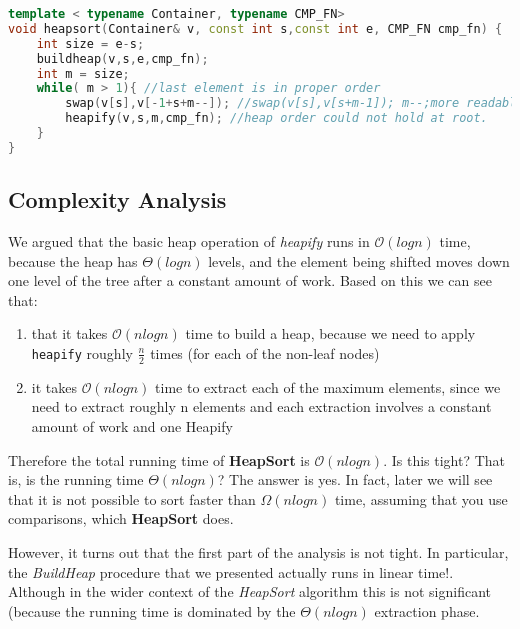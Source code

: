 \begin{lstlisting}[language=c++, caption="Create an heap from an unordered collection. cmp\_fn determines if it will be a min or max heap"]
template < typename Container, typename CMP_FN>
void heapsort(Container& v, const int s,const int e, CMP_FN cmp_fn) {
    int size = e-s;
    buildheap(v,s,e,cmp_fn);
    int m = size;
    while( m > 1){ //last element is in proper order
        swap(v[s],v[-1+s+m--]); //swap(v[s],v[s+m-1]); m--;more readable 
        heapify(v,s,m,cmp_fn); //heap order could not hold at root.
    }
}
\end{lstlisting}

\subsection{Complexity Analysis}
We argued that the basic heap operation of \textit{heapify} runs in $\mathcal{O}(log n)$ time, because the heap has $\mathcal{\Theta}(log n)$ levels, and the element being shifted moves down one level of the tree after a constant amount of work.
Based on this we can see that:
\begin{enumerate}
\item that it takes $\mathcal{O}(nlog n)$ time to build a heap, because we need to apply \texttt{heapify} roughly $\frac{n}{2}$ times (for each of the non-leaf nodes)
\item it takes $\mathcal{O}(nlog n)$ time to extract each of the maximum elements, since we need to extract roughly n elements and each extraction involves a constant amount of work and one Heapify
\end{enumerate}
 Therefore the total running time of \textbf{HeapSort} is $\mathcal{O}(nlog n)$.
Is this tight? That is, is the running time $\mathcal{\Theta}(nlog n)$? The answer is yes. In fact, later we will see that it is not possible to sort faster than $\mathcal{\Omega}(nlog n)$ time, assuming that you use comparisons, which \textbf{HeapSort} does. 

However, it turns out that the first part of the analysis is not tight. In particular, the \textit{BuildHeap} procedure that we presented actually runs in linear time!. Although in the wider context of the \textit{HeapSort} algorithm this is not significant (because the running time is dominated by the $\mathcal{\Theta}(nlog n)$ extraction phase.

